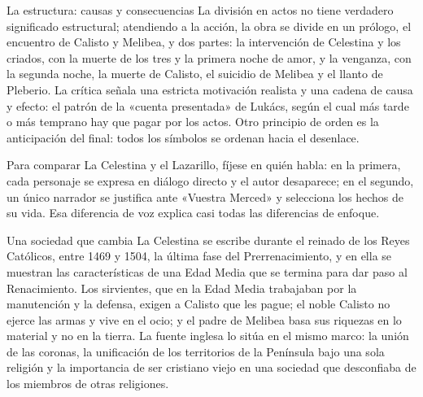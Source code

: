 \documentclass{book}
\begin{document}

\begin{tcolorbox}[title={Consejo}, studiumtip, breakable]

La estructura: causas y consecuencias
La división en actos no tiene verdadero significado estructural; atendiendo a la acción, la obra se divide en un prólogo, el encuentro de Calisto y Melibea, y dos partes: la intervención de Celestina y los criados, con la muerte de los tres y la primera noche de amor, y la venganza, con la segunda noche, la muerte de Calisto, el suicidio de Melibea y el llanto de Pleberio. La crítica señala una estricta motivación realista y una cadena de causa y efecto: el patrón de la «cuenta presentada» de Lukács, según el cual más tarde o más temprano hay que pagar por los actos. Otro principio de orden es la anticipación del final: todos los símbolos se ordenan hacia el desenlace.


Para comparar La Celestina y el Lazarillo, fíjese en quién habla: en la primera, cada personaje se expresa en diálogo directo y el autor desaparece; en el segundo, un único narrador se justifica ante «Vuestra Merced» y selecciona los hechos de su vida. Esa diferencia de voz explica casi todas las diferencias de enfoque.

\end{tcolorbox}

\begin{tcolorbox}[title={Definición}, studiumdef, breakable]

Una sociedad que cambia
La Celestina se escribe durante el reinado de los Reyes Católicos, entre 1469 y 1504, la última fase del Prerrenacimiento, y en ella se muestran las características de una Edad Media que se termina para dar paso al Renacimiento. Los sirvientes, que en la Edad Media trabajaban por la manutención y la defensa, exigen a Calisto que les pague; el noble Calisto no ejerce las armas y vive en el ocio; y el padre de Melibea basa sus riquezas en lo material y no en la tierra. La fuente inglesa lo sitúa en el mismo marco: la unión de las coronas, la unificación de los territorios de la Península bajo una sola religión y la importancia de ser cristiano viejo en una sociedad que desconfiaba de los miembros de otras religiones.

\end{tcolorbox}
\end{document}
